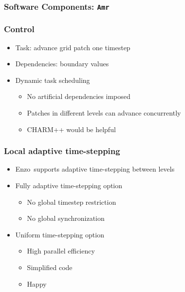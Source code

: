 \documentclass{beamer}
\newcommand{\enzo}{\textsf{Enzo}}
\newcommand{\code}[1]{\texttt{#1}}
\begin{document}
    \begin{frame}[fragile] \frametitle{Software Components: \code{Amr}}
\end{frame}

    \begin{frame}[fragile] \frametitle{Control}
      \begin{itemize}
        \item Task: advance grid patch one timestep
        \item Dependencies: boundary values
        \item Dynamic task scheduling
        \begin{itemize}
          \item No artificial dependencies imposed
          \item Patches in different levels can advance concurrently
          \item CHARM++ would be helpful
        \end{itemize}
      \end{itemize}
\end{frame}

    \begin{frame}[fragile] \frametitle{Local adaptive time-stepping}
      \begin{itemize}
        \item \enzo\ supports adaptive time-stepping between levels
        \item Fully adaptive time-stepping option
        \begin{itemize}
          \item No global timestep restriction
          \item No global synchronization
        \end{itemize}
        \item Uniform time-stepping option
        \begin{itemize}
          \item High parallel efficiency
          \item Simplified code
          \item Happy
        \end{itemize}
      \end{itemize}
\end{frame}
\end{document}
